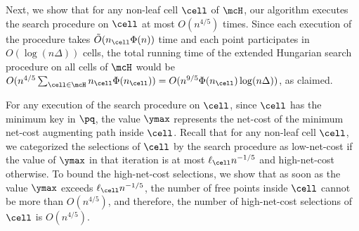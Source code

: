 Next, we show that for any non-leaf cell $\cell$ of $\mcH$, our algorithm executes the search procedure on $\cell$ at most $O(n^{4/5})$ times. Since each execution of the procedure takes $\tilde{O}(n_{\cell}\Phi(n))$ time and each point participates in $O(\log (n\Delta))$ cells, the total running time of the extended Hungarian search procedure on all cells of $\mcH$ would be $O(n^{4/5}\sum_{\cell\in\mcH}n_\cell\Phi(n_\cell)) = O(n^{9/5}\Phi(n_\cell)\log(n\Delta))$, as claimed.

For any execution of the search procedure on $\cell$, since $\cell$ has the minimum key in $\pq$, the value $\ymax$ represents the net-cost of the minimum net-cost augmenting path inside $\cell$.
Recall that for any non-leaf cell $\cell$, we categorized the selections of $\cell$ by the search procedure as low-net-cost if the value of $\ymax$ in that iteration is at most $\ell_\cell n^{-1/5}$ and high-net-cost otherwise. 
To bound the high-net-cost selections, we show that as soon as the value $\ymax$ exceeds $\ell_\cell n^{-1/5}$, the number of free points inside $\cell$ cannot be more than $O(n^{4/5})$, and therefore, the number of high-net-cost selections of $\cell$ is $O(n^{4/5})$.

